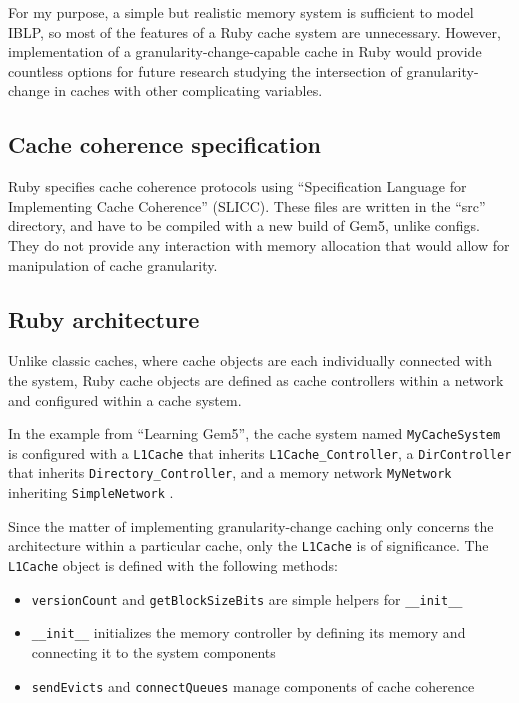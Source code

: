\documentclass[12pt,twoside]{reedthesis}
\begin{document}
	For my purpose, a simple but realistic memory system is sufficient to model IBLP, so most of the features of a Ruby cache system are unnecessary. However, implementation of a granularity-change-capable cache in Ruby would provide countless options for future research studying the intersection of granularity-change in caches with other complicating variables.

	\subsection*{Cache coherence specification}

	Ruby specifies cache coherence protocols using ``Specification Language for Implementing Cache Coherence'' (SLICC). These files are written in the ``src'' directory, and have to be compiled with a new build of Gem5, unlike configs. They do not provide any interaction with memory allocation that would allow for manipulation of cache granularity.

	\subsection*{Ruby architecture}

	Unlike classic caches, where cache objects are each individually connected with the system, Ruby cache objects are defined as cache controllers within a network and configured within a cache system.
	
	In the example from ``Learning Gem5'', the cache system named \verb`MyCacheSystem` is configured with a \verb`L1Cache` that inherits \verb`L1Cache_Controller`, a \verb`DirController` that inherits \verb`Directory_Controller`, and a memory network \verb`MyNetwork` inheriting \verb`SimpleNetwork` \cite{gem5-tutorial}.

	Since the matter of implementing granularity-change caching only concerns the architecture within a particular cache, only the \verb`L1Cache` is of significance. The \verb`L1Cache` object is defined with the following methods: \begin{itemize}
		\item \verb`versionCount` and \verb`getBlockSizeBits` are simple helpers for \verb`__init__`
		\item \verb`__init__` initializes the memory controller by defining its memory and connecting it to the system components
		\item \verb`sendEvicts` and \verb`connectQueues` manage components of cache coherence
	\end{itemize}
\end{document}
